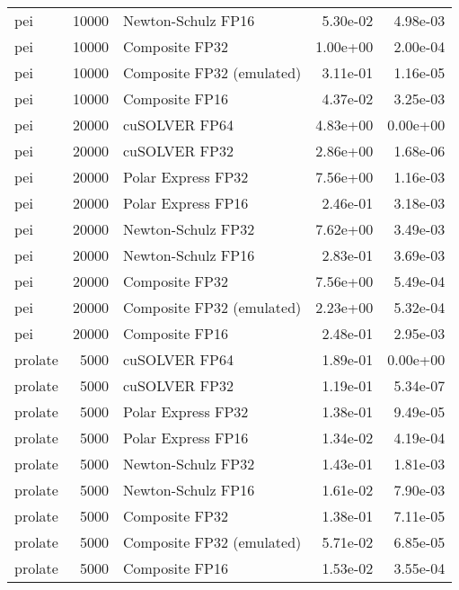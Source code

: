 \begin{table}
\begin{tabular}{lrlrr}
      pei & 10000 &        Newton-Schulz FP16 &  5.30e-02 &        4.98e-03 \\
      pei & 10000 &            Composite FP32 &  1.00e+00 &        2.00e-04 \\
      pei & 10000 & Composite FP32 (emulated) &  3.11e-01 &        1.16e-05 \\
      pei & 10000 &            Composite FP16 &  4.37e-02 &        3.25e-03 \\
      pei & 20000 &             cuSOLVER FP64 &  4.83e+00 &        0.00e+00 \\
      pei & 20000 &             cuSOLVER FP32 &  2.86e+00 &        1.68e-06 \\
      pei & 20000 &        Polar Express FP32 &  7.56e+00 &        1.16e-03 \\
      pei & 20000 &        Polar Express FP16 &  2.46e-01 &        3.18e-03 \\
      pei & 20000 &        Newton-Schulz FP32 &  7.62e+00 &        3.49e-03 \\
      pei & 20000 &        Newton-Schulz FP16 &  2.83e-01 &        3.69e-03 \\
      pei & 20000 &            Composite FP32 &  7.56e+00 &        5.49e-04 \\
      pei & 20000 & Composite FP32 (emulated) &  2.23e+00 &        5.32e-04 \\
      pei & 20000 &            Composite FP16 &  2.48e-01 &        2.95e-03 \\
  prolate &  5000 &             cuSOLVER FP64 &  1.89e-01 &        0.00e+00 \\
  prolate &  5000 &             cuSOLVER FP32 &  1.19e-01 &        5.34e-07 \\
  prolate &  5000 &        Polar Express FP32 &  1.38e-01 &        9.49e-05 \\
  prolate &  5000 &        Polar Express FP16 &  1.34e-02 &        4.19e-04 \\
  prolate &  5000 &        Newton-Schulz FP32 &  1.43e-01 &        1.81e-03 \\
  prolate &  5000 &        Newton-Schulz FP16 &  1.61e-02 &        7.90e-03 \\
  prolate &  5000 &            Composite FP32 &  1.38e-01 &        7.11e-05 \\
  prolate &  5000 & Composite FP32 (emulated) &  5.71e-02 &        6.85e-05 \\
  prolate &  5000 &            Composite FP16 &  1.53e-02 &        3.55e-04 \\

\end{tabular}
\end{table}
